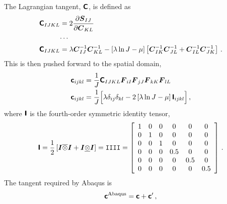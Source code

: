 \documentclass[10pt,letterpaper,oneside]{report}
\newcommand{\ten}[1]{\mbox{\boldmath $#1$}{}}
\newcommand{\tenf}[1]{\mbox{{\sffamily{\bfseries {#1}}}}}
\newcommand{\scas}[1]{\mbox{{\scriptsize{${\rm{#1}}$}}}{}}
\begin{document}
\begin{itemize}
The Lagrangian tangent, $\tenf{C}$, is defined as
\begin{align}
\tenf{C}_{IJKL} ={}& 2 \frac{\partial \ten{S}_{IJ} }{\partial \ten{C}_{KL} }  
\\
\cdots{}& \notag \\
\tenf{C}_{IJKL} ={}& \lambda \ten{C}^{-1}_{IJ} \ten{C}^{-1}_{KL} - \left[ \lambda \ln J - \mu \right] \left[ \ten{C}^{-1}_{IK} \ten{C}^{-1}_{JL} + \ten{C}^{-1}_{IL} \ten{C}^{-1}_{JK} \right]  \, . 
\end{align}
This is then pushed forward to the spatial domain, 
\begin{align}
\tenf{c}_{ijkl} ={}& \frac{1}{J} \tenf{C}_{IJKL} \ten{F}_{iI} \ten{F}_{jJ} \ten{F}_{kK} \ten{F}_{lL} 
\\
\tenf{c}_{ijkl} ={}& \frac{1}{J} \Big[ \lambda \delta_{ij} \delta_{kl} - 2 \left[ \lambda \ln J - \mu \right] \tenf{I}_{ijkl} \Big] \, , 
\end{align}
where $\tenf{I}$ is the fourth-order symmetric identity tensor,
\begin{equation}
\tenf{I} 
= \frac{1}{2} \left[ \ten{I} \overline{\otimes} \ten{I} + \ten{I} \underline{\otimes} \ten{I} \right] 
= \mathtt{IIII} 
= \left[ \begin{array}{cccccc}
1 & 0 & 0 & 0   & 0   & 0 \\
0 & 1 & 0 & 0   & 0   & 0 \\
0 & 0 & 1 & 0   & 0   & 0 \\
0 & 0 & 0 & 0.5 & 0   & 0 \\
0 & 0 & 0 & 0   & 0.5 & 0 \\
0 & 0 & 0 & 0   & 0   & 0.5 \\
\end{array} \right] \, . 
\end{equation}
The tangent required by Abaqus is
\begin{equation}
\tenf{c}^{\scas{Abaqus}} = \tenf{c} + \tenf{c}' \, , 

\end{equation}
\end{itemize}
\end{document}

